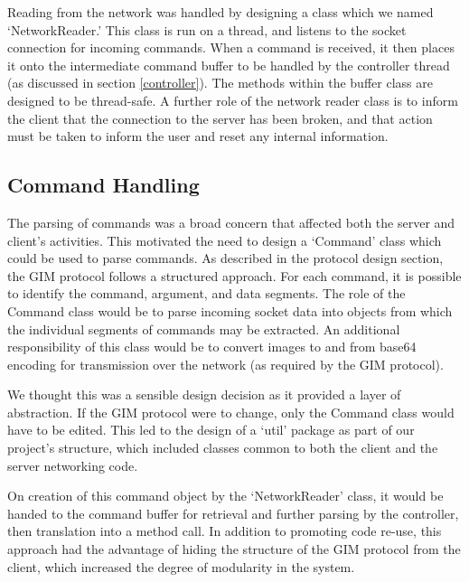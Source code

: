 Reading from the network was handled by designing a class which we named `NetworkReader.' This class is run on a thread, and listens to the socket connection for incoming commands. When a command is received, it then places it onto the intermediate command buffer to be handled by the controller thread (as discussed in section \ref{controller}). The methods within the buffer class are designed to be thread-safe. A further role of the network reader class is to inform the client that the connection to the server has been broken, and that action must be taken to inform the user and reset any internal information.

\subsection {Command Handling}

The parsing of commands was a broad concern that affected both the server and client's activities. This motivated the need to design a `Command' class which could be used to parse commands. As described in the protocol design section, the GIM protocol follows a structured approach. For each command, it is possible to identify the command, argument, and data segments. The role of the Command class would be to parse incoming socket data into objects from which the individual segments of commands may be extracted. An additional responsibility of this class would be to convert images to and from base64 encoding for transmission over the network (as required by the GIM protocol).

We thought this was a sensible design decision as it provided a layer of abstraction. If the GIM protocol were to change, only the Command class would have to be edited. This led to the design of a `util' package as part of our project's structure, which included classes common to both the client and the server networking code. 

On creation of this command object by the `NetworkReader' class, it would be handed to the command buffer for retrieval and further parsing by the controller, then translation into a method call. In addition to promoting code re-use, this approach had the advantage of hiding the structure of the GIM protocol from the client, which increased the degree of modularity in the system.   

